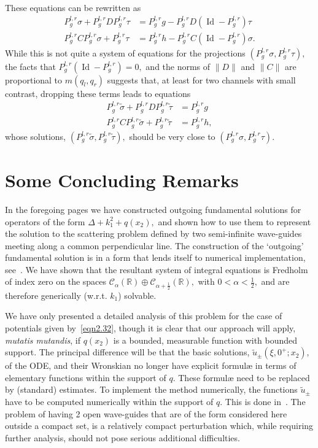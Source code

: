 \documentclass[11pt]{article}
\newcommand\tsigma{\widetilde \sigma}
\newcommand\ttau{\widetilde \tau}
\newcommand\tu{\widetilde u}
\newcommand\cC{\mathcal{C}}
\newcommand\bbR{\mathbb R}
\newcommand\Id{\operatorname{Id}}
\theoremstyle{definition}
\theoremstyle{remark}
\begin{document}
These equations can be rewritten as
\begin{equation}
  \begin{split}
    P^{l,r}_g\sigma+ P^{l,r}_g DP_g^{l,r}\tau&=P^{l,r}_gg-P^{l,r}_g D(\Id-P_g^{l,r})\tau\\
     P^{l,r}_gCP^{l,r}_g\sigma+ P^{l,r}_g \tau&=P^{l,r}_gh-P^{l,r}_gC(\Id-P^{l,r}_g)\sigma.
  \end{split}
\end{equation}
While this is not quite a system of equations for the projections
$(P^{l,r}_g\sigma,P^{l,r}_g\tau),$ the facts that $P^{l,r}_g(\Id-P^{l,r}_g)=0,$
and the norms of $\|D\|$ and $\|C\|$ are proportional to $m(q_l,q_r)$ suggests
that, at least for two channels with small contrast,  dropping these terms 
leads to equations
\begin{equation}
  \begin{split}
    P^{l,r}_g\tsigma+ P^{l,r}_g DP_g^{l,r}\ttau&=P^{l,r}_gg\\
     P^{l,r}_gCP^{l,r}_g\tsigma+ P^{l,r}_g \ttau&=P^{l,r}_gh,
  \end{split}
\end{equation}
whose solutions, $(P^{l,r}_g\tsigma,P_g^{l,r}\ttau),$  should be very close to
$(P^{l,r}_g\sigma,P_g^{l,r}\tau).$


\section{Some Concluding Remarks}
In the foregoing pages we have constructed outgoing fundamental
solutions for operators of the form $\Delta+k_1^2+q(x_2),$ and shown
how to use them to represent the solution to the scattering problem
defined by two semi-infinite wave-guides meeting along a common
perpendicular line. The construction of the `outgoing' fundamental
solution is in a form that lends itself to numerical
implementation, see~\cite{EpGo2024,EGHQR2025}. We have shown that the resultant system of integral
equations is Fredholm of index zero on the spaces
$\cC_{\alpha}(\bbR)\oplus\cC_{\alpha+\frac 12}(\bbR),$ with
$0<\alpha<\frac 12,$ and are therefore generically (w.r.t. $k_1$) solvable.

We have only presented a detailed analysis of this problem for the case of
potentials given by~\eqref{eqn2.32}, though it is clear that our approach will
apply, {\em mutatis mutandis}, if $q(x_2)$ is a bounded, measurable function
with bounded support. The principal difference will be that the basic solutions,
$\tu_{\pm}(\xi,0^+;x_2),$ of the ODE, and their Wronskian no longer have
explicit formul{\ae} in terms of elementary functions within the support of $q.$
These formul{\ae} need to be replaced by (standard) estimates. To implement the
method numerically, the functions $\tu_{\pm}$ have to be computed numerically
within the support of $q.$ This is done in~\cite{EGHQR2025}. The problem of
having 2 open wave-guides that are of the form considered here outside a compact
set, is a relatively compact perturbation which, while requiring further
analysis, should not pose serious additional difficulties.
\end{document}
